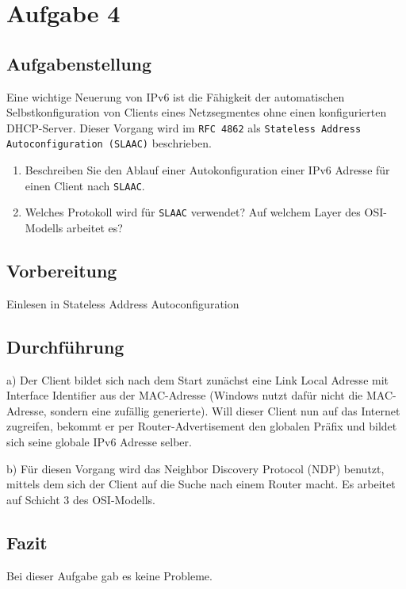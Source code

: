 \newpage

\section{Aufgabe 4}

\subsection{Aufgabenstellung}
Eine wichtige Neuerung von IPv6 ist die Fähigkeit der automatischen Selbstkonfiguration von Clients eines Netzsegmentes ohne einen konfigurierten DHCP-Server. Dieser Vorgang wird im \texttt{RFC 4862} als \texttt{Stateless Address Autoconfiguration (SLAAC)} beschrieben.

\begin{enumerate}[label=(\alph*)]
	\item Beschreiben Sie den Ablauf einer Autokonfiguration einer IPv6 Adresse für einen Client nach \texttt{SLAAC}.
	\item Welches Protokoll wird für \texttt{SLAAC} verwendet? Auf welchem Layer des OSI-Modells arbeitet es?
\end{enumerate}

\subsection{Vorbereitung}
Einlesen in Stateless Address Autoconfiguration

\subsection{Durchführung}
a) Der Client bildet sich nach dem Start zunächst eine Link Local Adresse mit Interface Identifier aus der MAC-Adresse (Windows nutzt dafür nicht die MAC-Adresse, sondern eine zufällig generierte). Will dieser Client nun auf das Internet zugreifen, bekommt er per Router-Advertisement den globalen Präfix und bildet sich seine globale IPv6 Adresse selber.

b) Für diesen Vorgang wird das Neighbor Discovery Protocol (NDP) benutzt, mittels dem sich der Client auf die Suche nach einem Router macht. Es arbeitet auf Schicht 3 des OSI-Modells.
\subsection{Fazit}
Bei dieser Aufgabe gab es keine Probleme.
